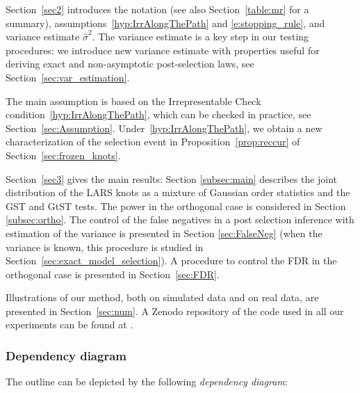 \documentclass[final,numbib]{imaiai}%
\numberwithin{equation}{section}
\renewcommand{\hat}{\widehat}
\newcommand{\<}{\langle}
\renewcommand{\>}{\rangle}
\newcommand{\1}{\mathds{1}}
\begin{document}
{{Section~\ref{sec2} introduces the notation (see also Section~\ref{table:mr} for a summary), assumptions~\eqref{hyp:IrrAlongThePath} and \eqref{e:stopping_rule}, and variance estimate $\hat \sigma^2$.
The variance estimate is a key step in our testing procedures: we introduce new variance estimate with properties useful for deriving exact and non-asymptotic post-selection laws, see Section~\ref{sec:var_estimation}.

The main assumption is based on the Irrepresentable Check condition~\eqref{hyp:IrrAlongThePath}, which can be checked in practice, see Section~\ref{sec:Assumption}.
Under~\eqref{hyp:IrrAlongThePath}, we obtain a new characterization of the selection event in Proposition~\ref{prop:reccur} of Section~\ref{sec:frozen_knots}.


Section~\ref{sec3} gives the main results:  Section \ref{subsec:main} describes the joint distribution of the LARS knots as a mixture  of Gaussian order statistics and the GST and GtST tests.
The power in the orthogonal case is considered in Section \ref{subsec:ortho}.
The control of the  false negatives  in a post selection  inference with estimation of the variance  is presented in Section \ref{sec:FalseNeg} (when the variance is known, this procedure is studied in Section~\ref{sec:exact_model_selection}).
A procedure  to control the FDR in the orthogonal case is presented  in Section~\ref{sec:FDR}.

Illustrations of our method, both on simulated data and on real data, are presented in Section~\ref{sec:num}.
A Zenodo repository of the code used in all our experiments can be found at \cite{yohann_de_castro_2021_5079768}.


\pagebreak

\subsubsection{Dependency diagram}  
The outline can be depicted by the following {\it dependency diagram}:

\vspace*{0.5cm}


}}
\end{document}
